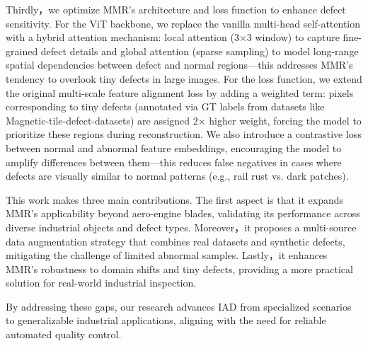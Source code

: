 Thirdly，we optimize MMR’s architecture and loss function to enhance defect sensitivity. 
For the ViT backbone, we replace the vanilla multi-head self-attention with a hybrid attention mechanism: local attention (3×3 window) to capture fine-grained defect details and global attention (sparse sampling) to model long-range spatial dependencies between defect and normal regions—this addresses MMR’s tendency to overlook tiny defects in large images. For the loss function, we extend the original multi-scale feature alignment loss by adding a weighted term: pixels corresponding to tiny defects (annotated via GT labels from datasets like Magnetic-tile-defect-datasets) are assigned 2× higher weight, forcing the model to prioritize these regions during reconstruction. We also introduce a contrastive loss between normal and abnormal feature embeddings, encouraging the model to amplify differences between them—this reduces false negatives in cases where defects are visually similar to normal patterns (e.g., rail rust vs. dark patches).

This work makes three main contributions. The first aspect is that it expands MMR’s applicability beyond aero-engine blades, validating its performance across diverse industrial objects and defect types. Moreover，it proposes a multi-source data augmentation strategy that combines real datasets and synthetic defects, mitigating the challenge of limited abnormal samples. Lastly，it enhances MMR’s robustness to domain shifts and tiny defects, providing a more practical solution for real-world industrial inspection.

By addressing these gaps, our research advances IAD from specialized scenarios to generalizable industrial applications, aligning with the need for reliable automated quality control.
